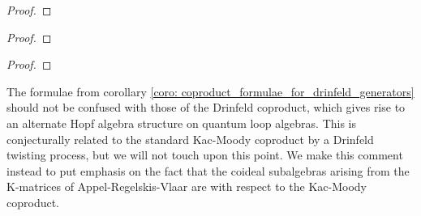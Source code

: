         \begin{lemma} \label{lemma: drinfeld_current_presentation_for_loop_QUEs}
        \end{lemma}
            \begin{proof}
                
            \end{proof}
        \begin{corollary} \label{coro: triangular_decomposition_for_loop_QUEs}
            
        \end{corollary}
            \begin{proof}
                
            \end{proof}
        \begin{corollary} \label{coro: coproduct_formulae_for_drinfeld_generators}
            
        \end{corollary}
            \begin{proof}
                
            \end{proof}
        \begin{remark}
            The formulae from corollary \ref{coro: coproduct_formulae_for_drinfeld_generators} should not be confused with those of the Drinfeld coproduct, which gives rise to an alternate Hopf algebra structure on quantum loop algebras. This is conjecturally related to the standard Kac-Moody coproduct by a Drinfeld twisting process, but we will not touch upon this point. We make this comment instead to put emphasis on the fact that the coideal subalgebras arising from the K-matrices of Appel-Regelskis-Vlaar are with respect to the Kac-Moody coproduct. 
        \end{remark}

